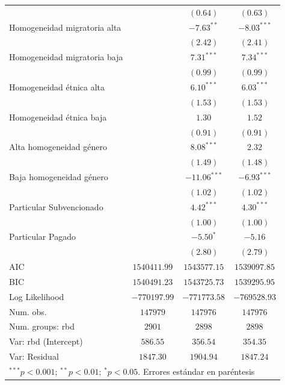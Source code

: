 \documentclass[
]{article}
\begin{document}
\begin{table}
\begin{center}
\begin{tabular}{l c c c}
                             &                & $(0.64)$       & $(0.63)$       \\
Homogeneidad migratoria alta &                & $-7.63^{**}$   & $-8.03^{***}$  \\
                             &                & $(2.42)$       & $(2.41)$       \\
Homogeneidad migratoria baja &                & $7.31^{***}$   & $7.34^{***}$   \\
                             &                & $(0.99)$       & $(0.99)$       \\
Homogeneidad étnica alta     &                & $6.10^{***}$   & $6.03^{***}$   \\
                             &                & $(1.53)$       & $(1.53)$       \\
Homogeneidad étnica baja     &                & $1.30$         & $1.52$         \\
                             &                & $(0.91)$       & $(0.91)$       \\
Alta homogeneidad género     &                & $8.08^{***}$   & $2.32$         \\
                             &                & $(1.49)$       & $(1.48)$       \\
Baja homogeneidad género     &                & $-11.06^{***}$ & $-6.93^{***}$  \\
                             &                & $(1.02)$       & $(1.02)$       \\
Particular Subvencionado     &                & $4.42^{***}$   & $4.30^{***}$   \\
                             &                & $(1.00)$       & $(1.00)$       \\
Particular Pagado            &                & $-5.50^{*}$    & $-5.16$        \\
                             &                & $(2.80)$       & $(2.79)$       \\
\hline
AIC                          & $1540411.99$   & $1543577.15$   & $1539097.85$   \\
BIC                          & $1540491.23$   & $1543725.73$   & $1539295.95$   \\
Log Likelihood               & $-770197.99$   & $-771773.58$   & $-769528.93$   \\
Num. obs.                    & $147979$       & $147976$       & $147976$       \\
Num. groups: rbd             & $2901$         & $2898$         & $2898$         \\
Var: rbd (Intercept)         & $586.55$       & $356.54$       & $354.35$       \\
Var: Residual                & $1847.30$      & $1904.94$      & $1847.24$      \\
\hline
\multicolumn{4}{l}{\scriptsize{$^{***}p<0.001$; $^{**}p<0.01$; $^{*}p<0.05$. Errores estándar en paréntesis}}
\end{tabular}
\label{table:coefficients}
\end{center}
\end{table}
\end{document}
